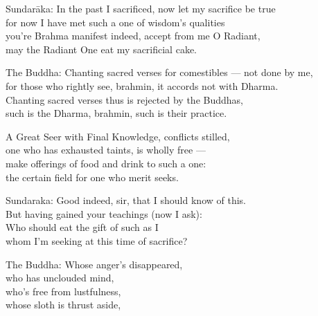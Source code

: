 \begin{MyDescription}{Sundar\=aka:}
In the past I sacrificed, now let my sacrifice be true\\
for now I have met such a one of wisdom's qualities\\
you're Brahma manifest indeed, accept from me O Radiant,\\
may the Radiant One eat my sacrificial cake.
\end{MyDescription}

\begin{MyDescription}{The Buddha: }
Chanting sacred verses for comestibles — not done by me,\\
for those who rightly see, brahmin, it accords not with Dharma.\\
Chanting sacred verses thus is rejected by the Buddhas,\\
such is the Dharma, brahmin, such is their practice.
\end{MyDescription}

\begin{MyDescription}{}
A Great Seer with Final Knowledge, conflicts stilled,\\
one who has exhausted taints, is wholly free —\\
make offerings of food and drink to such a one:\\
the certain field for one who merit seeks.
\end{MyDescription}

\begin{MyDescription}{Sundaraka:}
Good indeed, sir, that I should know of this.\\
But having gained your teachings (now I ask):\\
Who should eat the gift of such as I\\
whom I'm seeking at this time of sacrifice?
\end{MyDescription}

\begin{MyDescription}{The Buddha:}
Whose anger's disappeared,\\
who has unclouded mind,\\
who's free from lustfulness,\\
whose sloth is thrust aside,
\end{MyDescription}

